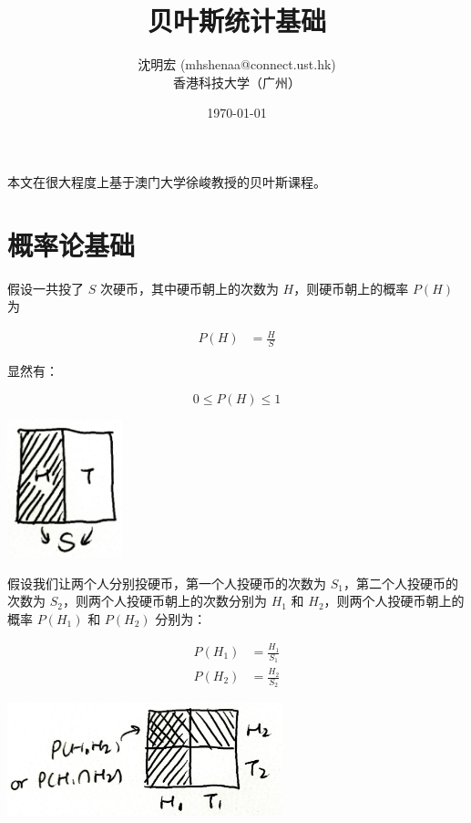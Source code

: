 \documentclass[UTF8]{ctexart}
\title{贝叶斯统计基础}
\author{沈明宏 (mhshenaa@connect.ust.hk)\\香港科技大学（广州）}
\date{\today}
\begin{document}
\maketitle
\tableofcontents

\vspace{6cm}
\begin{center}
	本文在很大程度上基于澳门大学徐峻教授的贝叶斯课程。
\end{center}

\newpage
\section{概率论基础}

假设一共投了 $S$ 次硬币，其中硬币朝上的次数为 $H$，则硬币朝上的概率 $P(H)$ 为

\begin{equation}
	\begin{aligned}
		P(H) & = \frac{H}{S}
	\end{aligned}
\end{equation}

显然有：

\begin{equation}
	0 \leq P(H) \leq 1
\end{equation}

\begin{center}
	\includegraphics[width=0.25\textwidth]{fig1.jpg}
\end{center}

假设我们让两个人分别投硬币，第一个人投硬币的次数为 $S_1$，第二个人投硬币的次数为 $S_2$，则两个人投硬币朝上的次数分别为 $H_1$ 和 $H_2$，则两个人投硬币朝上的概率 $P(H_1)$ 和 $P(H_2)$ 分别为：

\begin{equation}
	\begin{aligned}
		P(H_1) & = \frac{H_1}{S_1} \\
		P(H_2) & = \frac{H_2}{S_2}
	\end{aligned}
\end{equation}

\begin{center}
	\includegraphics[width=0.6\textwidth]{fig2.jpg}
\end{center}
\end{document}

